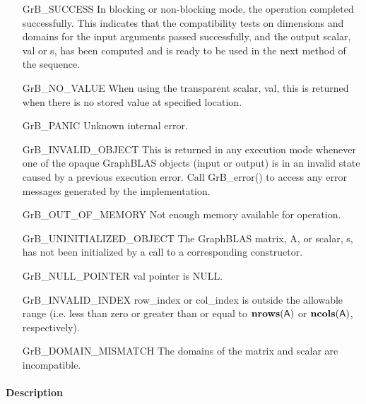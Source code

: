 \begin{itemize}[leftmargin=2.1in]
    \item[{\sf GrB\_SUCCESS}]  In blocking or non-blocking mode, the operation 
    completed successfully. This indicates that the compatibility tests on 
    dimensions and domains for the input arguments passed successfully, and
    the output scalar, {\sf val} or {\sf s}, has been computed and is ready to be used in 
    the next method of the sequence.

    \item[{\sf GrB\_NO\_VALUE}]  When using the transparent scalar, {\sf val}, this is returned when there is no stored value at specified location.

    \item[{\sf GrB\_PANIC}]   Unknown internal error.

    \item[{\sf GrB\_INVALID\_OBJECT}] This is returned in any execution mode 
    whenever one of the opaque GraphBLAS objects (input or output) is in an invalid 
    state caused by a previous execution error.  Call {\sf GrB\_error()} to access 
    any error messages generated by the implementation.

    \item[{\sf GrB\_OUT\_OF\_MEMORY}]  Not enough memory available for operation.
    
    \item[{\sf GrB\_UNINITIALIZED\_OBJECT}]  The GraphBLAS matrix, {\sf A}, or scalar,
    {\sf s}, has not been initialized by a call to a corresponding constructor.

    \item[{\sf GrB\_NULL\_POINTER}]    {\sf val} pointer is {\sf NULL}.

    \item[{\sf GrB\_INVALID\_INDEX}]  {\sf row\_index} or {\sf col\_index} is 
    outside the allowable range (i.e. less than zero or greater than or equal to 
    $\mathbf{nrows}({\sf A})$ or $\mathbf{ncols}({\sf A})$, respectively).

    \item[{\sf GrB\_DOMAIN\_MISMATCH}]     The domains of the matrix and scalar
    are incompatible.
\end{itemize}

\paragraph{Description}

